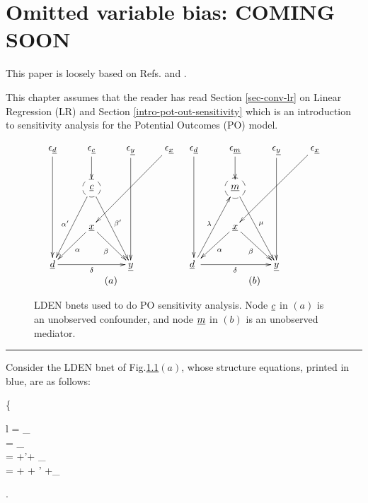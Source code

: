 \chapter{Omitted variable bias: COMING SOON}
\label{ch-omitted-var-bias}

This paper is
loosely based on Refs.\cite{cinelli-haz}
and \cite{cherno-cinelli}.

This chapter assumes that the
reader has read Section 
\ref{sec-conv-lr}
on Linear Regression (LR)
and Section \ref{intro-pot-out-sensitivity}
which is an introduction
to sensitivity analysis
for the Potential Outcomes (PO)
model.


\begin{figure}[h!]
$$
\begin{array}{cc}
\xymatrix{
\eps_\rvd\ar[ddd]
&\eps_\rvc\ar[d]
&\eps_\rvy\ar[ddd]
&\eps_\rvx\ar[ddll]
\\
&*++[F-o]{\rvc}\ar[ldd]_{\alp'}
\ar[rdd]^{\beta'}
\\
&\rvx
\ar[ld]^\alp
\ar[rd]_\beta
\\
\rvd\ar[rr]_\delta
&&\rvy
}
&
\xymatrix{
\eps_\rvd\ar[ddd]
&\eps_\rvm\ar[d]
&\eps_\rvy\ar[ddd]
&\eps_\rvx\ar[ddll]
\\
&*++[F-o]{\rvm}
\ar[rdd]^{\mu}
\\
&\rvx
\ar[ld]^\alp
\ar[rd]_\beta
\\
\rvd\ar[rr]_\delta
\
\ar[ruu]^\lam
&&\rvy
}
\\
(a)&(b)
\end{array}
$$
\caption{LDEN bnets used to do PO
sensitivity analysis.
Node ${\underline{c}}$ in $(a)$
is an unobserved confounder,
and node ${\underline{m}}$ in $(b)$
is an unobserved mediator.}
\label{eq-ovb-sen-ana}
\end{figure}







\hrule
Consider the LDEN bnet of Fig.\ref{eq-ovb-sen-ana}$(a)$,
whose structure equations,
printed in blue, are as follows:

\beq
\color{blue}
\left\{
\begin{array}{l}
\rvc = \rveps_\rvc
\\
\rvx = \eps_\rvx
\\
\rvd = \alp\rvx +\alp'\rvc + \eps_\rvd
\\ 
\rvy = \delta \rvd +
\beta \rvx + \beta'\rvc
+\eps_\rvy
\end{array}
\right.
\eeq

\beq
{}
\eeq


